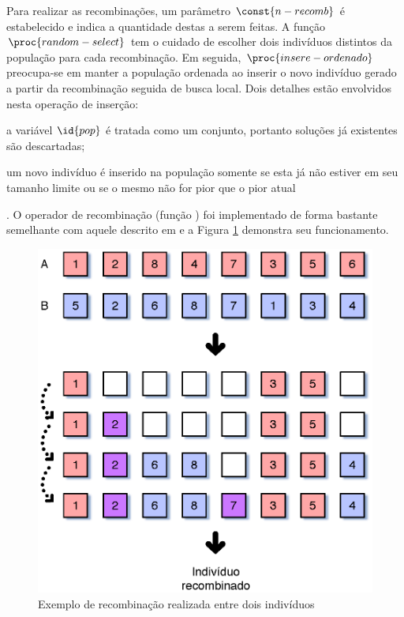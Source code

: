Para realizar as recombinações, um parâmetro $\const{n-recomb}$ é
estabelecido e indica a quantidade destas a serem feitas. A função
$\proc{random-select}$ tem o cuidado de escolher dois indivíduos
distintos da população para cada recombinação. Em seguida,
$\proc{insere-ordenado}$ preocupa-se em manter a população ordenada ao
inserir o novo indivíduo gerado a partir da recombinação seguida de busca
local. Dois detalhes estão envolvidos nesta operação de
inserção: \begin{inparaenum}[(1)] \item a
variável $\id{pop}$ é tratada como um conjunto, portanto
soluções já existentes são descartadas; \item um novo indivíduo é
inserido na população somente se esta já não estiver em seu tamanho
limite ou se o mesmo não for pior que o pior atual\end{inparaenum}. O
operador de recombinação (função ) foi implementado
de forma bastante semelhante com aquele descrito em
\cite{merz_freisleben} e a Figura \ref{fig:recomb-op} demonstra seu
funcionamento.

\begin{figure}
  \centering
  \includegraphics[scale=0.67]{recomb-op}
  \caption{Exemplo de recombinação realizada entre dois
    indivíduos\label{fig:recomb-op}}
\end{figure}


